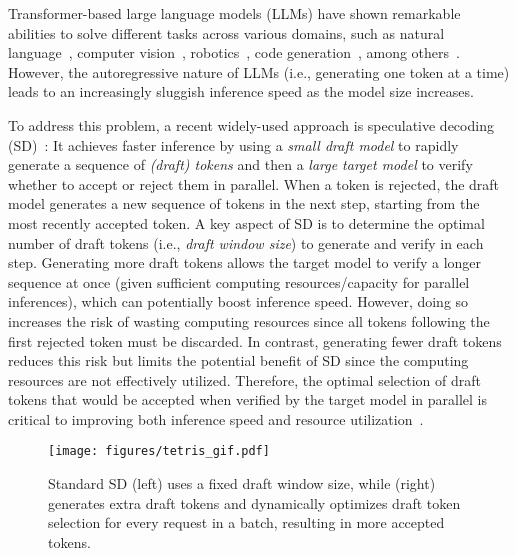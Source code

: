 

Transformer-based large language models (LLMs) have shown remarkable abilities to solve different tasks across various domains, such as natural language~\citep{zhao2023survey}, computer vision~\citep{Yin2024mllm}, robotics~\citep{zeng2023largelanguagemodelsrobotics}, code generation~\citep{rozière2024codellamaopenfoundation}, among others~\citep{maslej2024ai-report}. 
However, the autoregressive nature of LLMs (i.e., generating one token at a time) leads to an increasingly sluggish inference speed as the model size increases. 


To address this problem, a recent widely-used approach is speculative decoding (SD)~\citep{cai2024medusa,cheng2024recurrentdrafterfastspeculative,leviathan2023,li2024eagle2,li2024eagle}: It achieves faster inference by using a \textit{small draft model} to rapidly generate a sequence of {\em (draft) tokens} and then a {\em large target model} to verify whether to accept or reject them in parallel. 
When a token is rejected, the draft model generates a new sequence of tokens in the next step, starting from the most recently accepted token.
A key aspect of SD is to determine the optimal number of draft tokens (i.e., {\em draft window size}) to generate and verify in each step.
Generating more draft tokens allows the target model to verify a longer sequence at once (given sufficient computing resources/capacity for parallel inferences), which can potentially boost inference speed. 
However, doing so increases the risk of wasting computing resources since all tokens following the first rejected token must be discarded.
In contrast, generating fewer draft tokens reduces this risk but limits the potential benefit of SD since the computing resources are not effectively utilized.
Therefore, the optimal selection of draft tokens that would be accepted when verified by the target model in parallel is critical to improving both inference speed and resource utilization~\citep{liu2024optimizingspeculativedecodingserving}.

\begin{figure}[t]
    \centering
    \texttt{[image: figures/tetris\_gif.pdf]}
    \caption{
        \textcolor{red!60!black}{Standard SD} (left) uses a fixed draft window size, while \textcolor{green!50!black}{\alg{}} (right) generates extra draft tokens and dynamically optimizes draft token selection for every request in a batch, resulting in more accepted tokens. 
    }
    \label{fig:tetris_illustration}
    \vspace{-5mm}
\end{figure}


